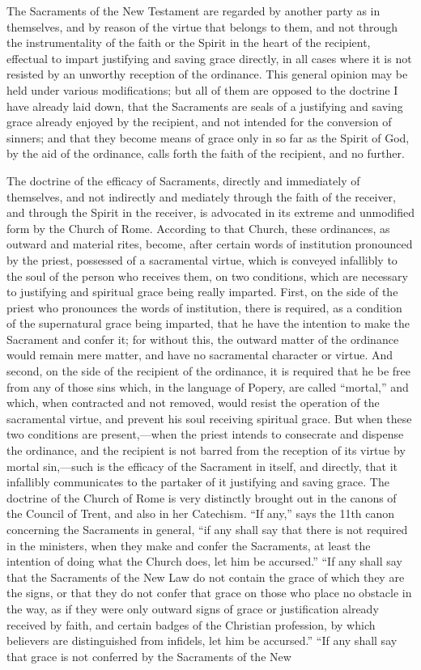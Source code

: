 \documentclass[]{book}
\begin{document}
The Sacraments of the New Testament are regarded by another party as in themselves, and by reason of the virtue that belongs to them, and not through the instrumentality of the faith or the Spirit in the heart of the recipient, effectual to impart justifying and saving grace directly, in all cases where it is not resisted by an unworthy reception of the ordinance. This general opinion may be held under various modifications; but all of them are opposed to the doctrine I have already laid down, that the Sacraments are seals of a justifying and saving grace already enjoyed by the recipient, and not intended for the conversion of sinners; and that they become means of grace only in so far as the Spirit of God, by the aid of the ordinance, calls forth the faith of the recipient, and no further.

The doctrine of the efficacy of Sacraments, directly and immediately of themselves, and not indirectly and mediately through the faith of the receiver, and through the Spirit in the receiver, is advocated in its extreme and unmodified form by the Church of Rome. According to that Church, these ordinances, as outward and material rites, become, after certain words of institution pronounced by the priest, possessed of a sacramental virtue, which is conveyed infallibly to the soul of the person who receives them, on two conditions, which are necessary to justifying and spiritual grace being really imparted. First, on the side of the priest who pronounces the words of institution, there is required, as a condition of the supernatural grace being imparted, that he have the intention to make the Sacrament and confer it; for without this, the outward matter of the ordinance would remain mere matter, and have no sacramental character or virtue. And second, on the side of the recipient of the ordinance, it is required that he be free from any of those sins which, in the language of Popery, are called ``mortal,'' and which, when contracted and not removed, would resist the operation of the sacramental virtue, and prevent his soul receiving spiritual grace. But when these two conditions are present,---when the priest intends to consecrate and dispense the ordinance, and the recipient is not barred from the reception of its virtue by mortal sin,---such is the efficacy of the Sacrament in itself, and directly, that it infallibly communicates to the partaker of it justifying and saving grace. The doctrine of the Church of Rome is very distinctly brought out in the canons of the Council of Trent, and also in her Catechism. ``If any,'' says the 11th canon concerning the Sacraments in general, ``if any shall say that there is not required in the ministers, when they make and confer the Sacraments, at least the intention of doing what the Church does, let him be accursed.'' ``If any shall say that the Sacraments of the New Law do not contain the grace of which they are the signs, or that they do not confer that grace on those who place no obstacle in the way, as if they were only outward signs of grace or justification already received by faith, and certain badges of the Christian profession, by which believers are distinguished from infidels, let him be accursed.'' ``If any shall say that grace is not conferred by the Sacraments of the New 
\end{document}
